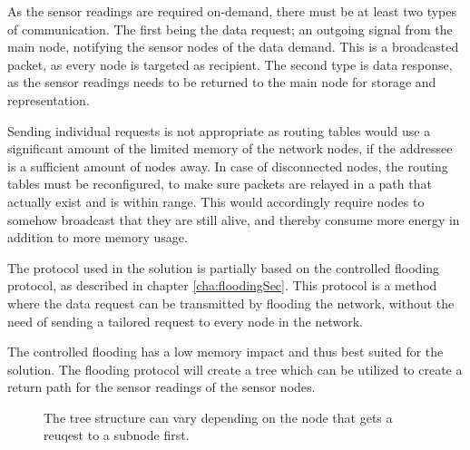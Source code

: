 
As the sensor readings are required on-demand, there must be at least two types of communication. The first being the data request; an outgoing signal from the main node, notifying the sensor nodes of the data demand. This is a broadcasted packet, as every node is targeted as recipient. The second type is data response, as the sensor readings needs to be returned to the main node for storage and representation.

Sending individual requests is not appropriate as routing tables would use a significant amount of the limited memory of the network nodes, if the addressee is a sufficient amount of nodes away. In case of disconnected nodes, the routing tables must be reconfigured, to make sure packets are relayed in a path that actually exist and is within range. This would accordingly require nodes to somehow broadcast that they are still alive, and thereby consume more energy in addition to more memory usage.

The protocol used in the solution is partially based on the controlled flooding protocol, as described in chapter \ref{cha:floodingSec}.
This protocol is a method where the data request can be transmitted by flooding the network, without the need of sending a tailored request to every node in the network. 

The controlled flooding has a low memory impact and thus best suited for the solution. The flooding protocol will create a tree which can be utilized to create a return path for the sensor readings of the sensor nodes.

\begin{figure}[h!]
	\centering
	\caption{The tree structure can vary depending on the node that gets a reuqest to a subnode first.}
	\label{fig:treeVariation}
\end{figure}

